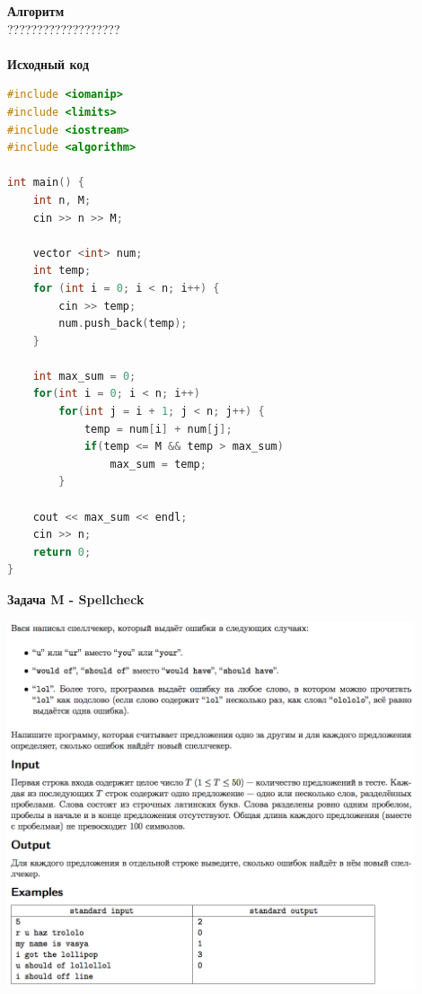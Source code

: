 \documentclass[a4paper,12pt]{article}
\begin{document}
\textbf{{\large Алгоритм}} \\
{\Huge ???????????????????} \\ 
\\
\textbf{{\large Исходный код}}
\begin{lstlisting}[language=C++]
#include <iomanip>
#include <limits>
#include <iostream>
#include <algorithm>

int main() {
    int n, M;
	cin >> n >> M;

	vector <int> num;
	int temp;
	for (int i = 0; i < n; i++) {
		cin >> temp;
		num.push_back(temp);
	}

	int max_sum = 0;
	for(int i = 0; i < n; i++)
		for(int j = i + 1; j < n; j++) {
			temp = num[i] + num[j];
			if(temp <= M && temp > max_sum)
				max_sum = temp;
		}

	cout << max_sum << endl;
    cin >> n;
    return 0;
}
\end{lstlisting}

\textbf{{\large Задача M - Spellcheck}} \\
\begin{center}
\includegraphics[width=0.9\textwidth]{OC_Japan/OC_Japan_M.png}\\ [1cm]
\end{center}
\newpage
\end{document}
